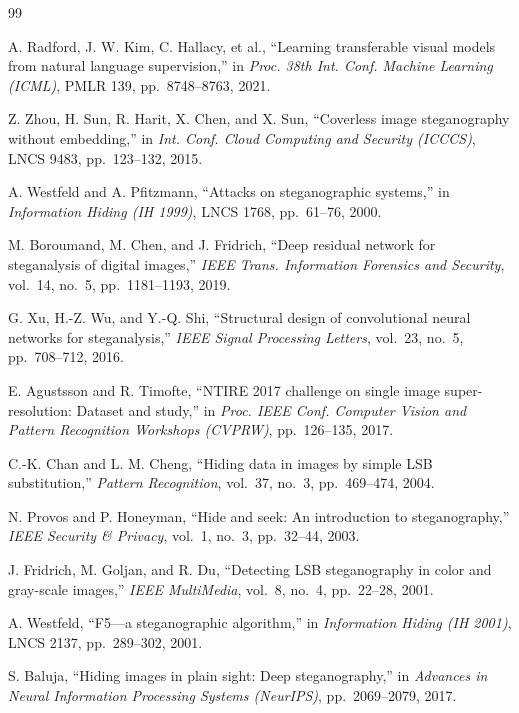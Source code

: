 \documentclass[10pt]{article}
\begin{document}
\begin{thebibliography}{99}

A. Radford, J. W. Kim, C. Hallacy, et al.,
``Learning transferable visual models from natural language supervision,''
in \emph{Proc. 38th Int. Conf. Machine Learning (ICML)}, PMLR 139, pp.~8748--8763, 2021.

Z. Zhou, H. Sun, R. Harit, X. Chen, and X. Sun,
``Coverless image steganography without embedding,''
in \emph{Int. Conf. Cloud Computing and Security (ICCCS)}, LNCS 9483, pp.~123--132, 2015.

A. Westfeld and A. Pfitzmann,
``Attacks on steganographic systems,''
in \emph{Information Hiding (IH 1999)}, LNCS 1768, pp.~61--76, 2000.

M. Boroumand, M. Chen, and J. Fridrich,
``Deep residual network for steganalysis of digital images,''
\emph{IEEE Trans. Information Forensics and Security}, vol.~14, no.~5, pp.~1181--1193, 2019.

G. Xu, H.-Z. Wu, and Y.-Q. Shi,
``Structural design of convolutional neural networks for steganalysis,''
\emph{IEEE Signal Processing Letters}, vol.~23, no.~5, pp.~708--712, 2016.

E. Agustsson and R. Timofte,
``NTIRE 2017 challenge on single image super-resolution: Dataset and study,''
in \emph{Proc. IEEE Conf. Computer Vision and Pattern Recognition Workshops (CVPRW)}, pp.~126--135, 2017.

C.-K. Chan and L. M. Cheng,
``Hiding data in images by simple LSB substitution,''
\emph{Pattern Recognition}, vol.~37, no.~3, pp.~469--474, 2004.

N. Provos and P. Honeyman,
``Hide and seek: An introduction to steganography,''
\emph{IEEE Security \& Privacy}, vol.~1, no.~3, pp.~32--44, 2003.

J. Fridrich, M. Goljan, and R. Du,
``Detecting LSB steganography in color and gray-scale images,''
\emph{IEEE MultiMedia}, vol.~8, no.~4, pp.~22--28, 2001.

A. Westfeld,
``F5---a steganographic algorithm,''
in \emph{Information Hiding (IH 2001)}, LNCS 2137, pp.~289--302, 2001.

S. Baluja,
``Hiding images in plain sight: Deep steganography,''
in \emph{Advances in Neural Information Processing Systems (NeurIPS)}, pp.~2069--2079, 2017.


\end{thebibliography}
\end{document}
